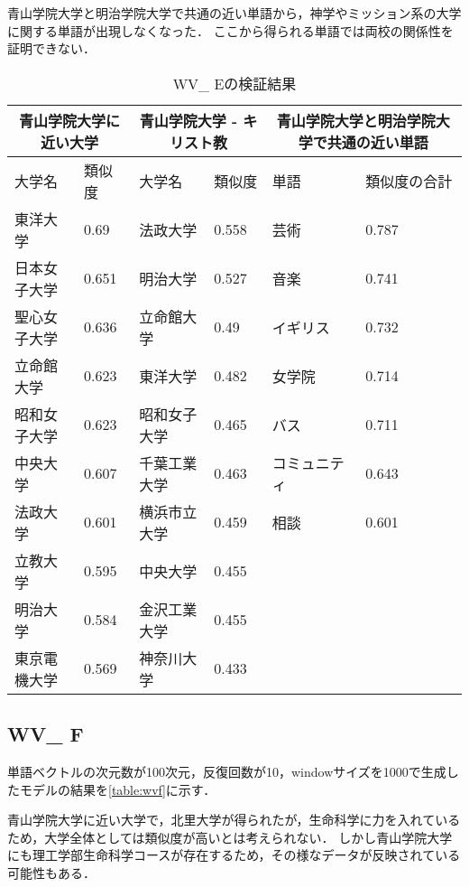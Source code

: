 青山学院大学と明治学院大学で共通の近い単語から，神学やミッション系の大学に関する単語が出現しなくなった．
ここから得られる単語では両校の関係性を証明できない．

\begin{table}[H]
\caption{WV\_ Eの検証結果}
\centering
\footnotesize
\begin{tabular}{ll|ll|ll}
\hline
\multicolumn{2}{c}{青山学院大学に近い大学} & \multicolumn{2}{c}{青山学院大学 - キリスト教} & \multicolumn{2}{c}{青山学院大学と明治学院大学で共通の近い単語}
\\ \hline
大学名 & 類似度 & 大学名 & 類似度 & 単語 & 類似度の合計
\\ \hline \hline
東洋大学 & 0.69 & 法政大学 & 0.558 & 芸術 & 0.787\\
日本女子大学 & 0.651 & 明治大学 & 0.527 & 音楽 & 0.741\\
聖心女子大学 & 0.636 & 立命館大学 & 0.49 & イギリス & 0.732\\
立命館大学 & 0.623 & 東洋大学 & 0.482 & 女学院 & 0.714\\
昭和女子大学 & 0.623 & 昭和女子大学 & 0.465 & バス & 0.711\\
中央大学 & 0.607 & 千葉工業大学 & 0.463 & コミュニティ & 0.643\\
法政大学 & 0.601 & 横浜市立大学 & 0.459 & 相談 & 0.601\\
立教大学 & 0.595 & 中央大学 & 0.455 & & \\
明治大学 & 0.584 & 金沢工業大学 & 0.455 & & \\
東京電機大学 & 0.569 & 神奈川大学 & 0.433 & & \\ \hline
\end{tabular}
\label{table:wve}
\end{table}

\subsection{WV\_ F}
単語ベクトルの次元数が100次元，反復回数が10，windowサイズを1000で生成したモデルの結果を\ref{table:wvf}に示す．

青山学院大学に近い大学で，北里大学が得られたが，生命科学に力を入れているため，大学全体としては類似度が高いとは考えられない．
しかし青山学院大学にも理工学部生命科学コースが存在するため，その様なデータが反映されている可能性もある．

